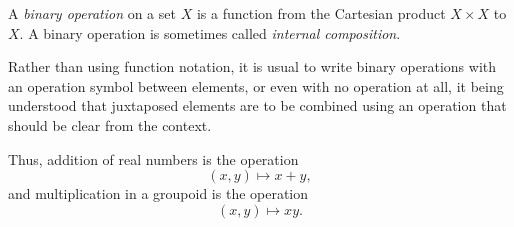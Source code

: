 \documentclass[12pt]{article}
\begin{document}
A \emph{binary operation} on a set $X$ is a function from the Cartesian product $X \times X$ to $X$.  A binary operation is sometimes called \emph{internal composition}.

Rather than using function notation, it is usual to write binary operations with an operation symbol between elements, or even with no operation at all, it being understood that juxtaposed elements are to be combined using an operation that should be clear from the context.

Thus, addition of real numbers is the operation
$$(x, y) \mapsto x + y,$$
and multiplication in a groupoid is the operation
$$(x, y) \mapsto xy.$$
\end{document}
